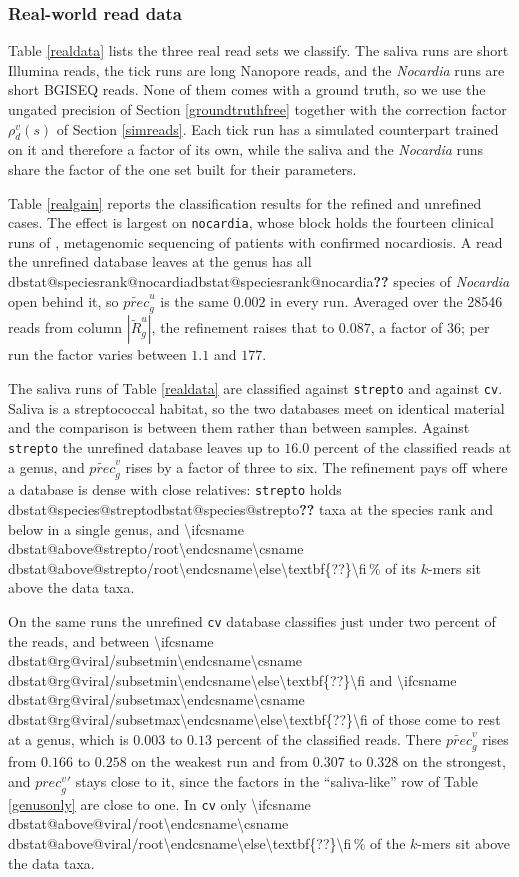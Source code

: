 \documentclass[pdflatex,sn-vancouver-num]{sn-jnl}
\makeatletter
\providecommand{\sysUnknown}{\textbf{??}}
\newcommand{\dbstat}[2]{\ifcsname dbstat@#1@#2\endcsname\csname dbstat@#1@#2\endcsname\else\sysUnknown\fi}
\makeatother
\begin{document}
    \subsubsection{Real-world read data}\label{realreads}

    Table \ref{realdata} lists the three real read sets we classify. The saliva runs are short Illumina reads, the tick runs are long Nanopore reads, and the \emph{Nocardia} runs are short BGISEQ reads. None of them comes with a ground truth, so we use the ungated precision of Section \ref{groundtruthfree} together with the correction factor $\rho^v_d(s)$ of Section \ref{simreads}. Each tick run has a simulated counterpart trained on it and therefore a factor of its own, while the saliva and the \emph{Nocardia} runs share the factor of the one set built for their parameters.

    Table \ref{realgain} reports the classification results for the refined and unrefined cases. The effect is largest on \texttt{nocardia}, whose block holds the fourteen clinical runs of \citep{nocardiamngs}, metagenomic sequencing of patients with confirmed nocardiosis. A read the unrefined database leaves at the genus has all \dbstat{speciesrank}{nocardia} species of \emph{Nocardia} open behind it, so $\widetilde{\mathit{prec}}^u_g$ is the same $0.002$ in every run. Averaged over the \num{28546} reads from column $|\widetilde{R}^u_g|$, the refinement raises that to $0.087$, a factor of \num{36}; per run the factor varies between $1.1$ and $177$.

    The saliva runs of Table \ref{realdata} are classified against \texttt{strepto} and against \texttt{cv}. Saliva is a streptococcal habitat, so the two databases meet on identical material and the comparison is between them rather than between samples. Against \texttt{strepto} the unrefined database leaves up to $16.0$ percent of the classified reads at a genus, and $\widetilde{\mathit{prec}}^v_g$ rises by a factor of three to six. The refinement pays off where a database is dense with close relatives: \texttt{strepto} holds \dbstat{species}{strepto} taxa at the species rank and below in a single genus, and \num[round-mode=places,round-precision=1]{\dbstat{above}{strepto/root}}\,\% of its $k$-mers sit above the data taxa.

    On the same runs the unrefined \texttt{cv} database classifies just under two percent of the reads, and between \num[group-separator={,},group-minimum-digits=4]{\dbstat{rg}{viral/subsetmin}} and \num[group-separator={,},group-minimum-digits=4]{\dbstat{rg}{viral/subsetmax}} of those come to rest at a genus, which is $0.003$ to $0.13$ percent of the classified reads. There $\widetilde{\mathit{prec}}^v_g$ rises from $0.166$ to $0.258$ on the weakest run and from $0.307$ to $0.328$ on the strongest, and $\mathit{prec}^{v}_g{}'$ stays close to it, since the factors in the \enquote{saliva-like} row of Table \ref{genusonly} are close to one. In \texttt{cv} only \num[round-mode=places,round-precision=1]{\dbstat{above}{viral/root}}\,\% of the $k$-mers sit above the data taxa.
\end{document}
